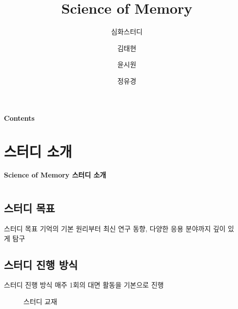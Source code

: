 \documentclass{beamer}
\date{\displaydate{date}}
\title{Science of Memory}
\subtitle{심화스터디}
\author{김태현\and 윤시원\and 정유경}
\institute{BCSC 2025}
\date{\displaydate{date}}
\begin{document}
\begin{frame}
    \titlepage
\end{frame}

\begin{frame}{\textbf{Contents}}
  \tableofcontents
\end{frame}

\section{스터디 소개}
\begin{frame}{\textbf{Science of Memory 스터디 소개}}
  \begin{columns}
    \begin{column}{0.39\textwidth}
      \subsection{스터디 목표}
      \begin{block}{스터디 목표}
        기억의 기본 원리부터 최신 연구 동향, 다양한 응용 분야까지 깊이 있게 탐구
      \end{block}
      \subsection{스터디 진행 방식}
      \begin{block}{스터디 진행 방식}
        매주 1회의 대면 활동을 기본으로 진행
      \end{block}
      \vspace{-1em}
      \begin{figure}
        \centering
        \qquad
        \vspace{-0.5em}
        \caption{스터디 교재}
      \end{figure}
    \end{column}
    \hfill
    \begin{column}{0.6\textwidth}

\end{column}
\end{columns}
\end{frame}
\end{document}
